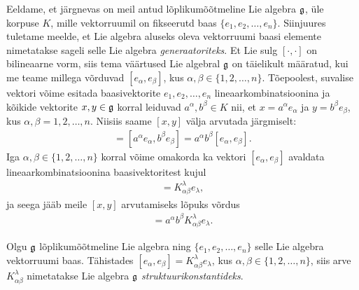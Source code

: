 Eeldame, et järgnevas on meil antud lõplikumõõtmeline Lie algebra $\mathfrak{g}$,
üle korpuse $K$, mille vektorruumil on fikseerutd baas
$\{ e_1, e_2, \dots, e_n \}$. Siinjuures tuletame meelde, et Lie algebra
aluseks oleva vektorruumi baasi elemente nimetatakse sageli selle
Lie algebra \emph{generaatoriteks}. Et Lie sulg
$[\cdot, \cdot]$ on bilineaarne vorm, siis tema väärtused Lie algebral
$\mathfrak{g}$ on täielikult määratud, kui me teame millega võrduvad
$[e_\alpha, e_\beta]$, kus $\alpha, \beta \in \{1, 2, \dots, n\}$.
Tõepoolest, suvalise vektori võime esitada baasivektorite
$e_1, e_2, \dots, e_n$ lineaarkombinatsioonina ja kõikide vektorite
$x, y \in \mathfrak{g}$ korral leiduvad $a^\alpha, b^\beta \in K$ nii, et
$x = a^\alpha e_\alpha$ ja $y = b^\beta e_\beta$, kus
$\alpha, \beta = 1, 2, \dots, n$. Niisiis saame $[x, y]$ välja arvutada
järgmiselt:
\begin{align*}
    [x, y] = [a^\alpha e_\alpha, b^\beta e_\beta] = 
    a^\alpha b^\beta [e_\alpha, e_\beta].
\end{align*}
Iga $\alpha, \beta \in \{1, 2, \dots, n\}$ korral võime omakorda ka
vektori $[e_\alpha, e_\beta]$ avaldata lineaarkombinatsioonina
baasivektoritest kujul
\begin{align*}
    [e_\alpha, e_\beta] = K_{\alpha \beta}^{\lambda} e_\lambda,
\end{align*}
ja seega jääb meile $[x, y]$ arvutamiseks lõpuks võrdus
\begin{align*}
    [x, y] = a^\alpha b^\beta K_{\alpha \beta}^{\lambda} e_\lambda.
\end{align*}

\begin{dfn}
    Olgu $\mathfrak{g}$ lõplikumõõtmeline Lie algebra ning $\{ e_1, e_2, \dots, e_n \}$
    selle Lie algebra vektorruumi baas. Tähistades
    $[e_\alpha, e_\beta] = K_{\alpha \beta}^{\lambda} e_\lambda$, kus
    $\alpha, \beta \in \{1, 2, \dots, n\}$, siis arve
    $K_{\alpha \beta}^{\lambda}$ nimetatakse Lie algebra $\mathfrak{g}$
    \emph{struktuurikonstantideks}.
\end{dfn}

